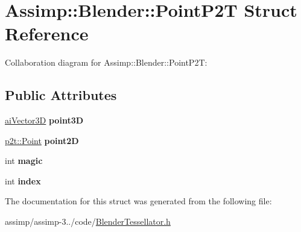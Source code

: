 \hypertarget{struct_assimp_1_1_blender_1_1_point_p2_t}{\section{Assimp\+:\+:Blender\+:\+:Point\+P2\+T Struct Reference}
\label{struct_assimp_1_1_blender_1_1_point_p2_t}
}


Collaboration diagram for Assimp\+:\+:Blender\+:\+:Point\+P2\+T\+:
\subsection*{Public Attributes}
\begin{DoxyCompactItemize}
\item 
\hypertarget{struct_assimp_1_1_blender_1_1_point_p2_t_a496ec2ad1a72b8cbeb76b5b60286ebbc}{\hyperlink{structai_vector3_d}{ai\+Vector3\+D} {\bfseries point3\+D}}\label{struct_assimp_1_1_blender_1_1_point_p2_t_a496ec2ad1a72b8cbeb76b5b60286ebbc}

\item 
\hypertarget{struct_assimp_1_1_blender_1_1_point_p2_t_af37c9a8398a17a07121573d2ff608a0b}{\hyperlink{structp2t_1_1_point}{p2t\+::\+Point} {\bfseries point2\+D}}\label{struct_assimp_1_1_blender_1_1_point_p2_t_af37c9a8398a17a07121573d2ff608a0b}

\item 
\hypertarget{struct_assimp_1_1_blender_1_1_point_p2_t_a93b81306d9ed6ab60c98f889dfb6648a}{int {\bfseries magic}}\label{struct_assimp_1_1_blender_1_1_point_p2_t_a93b81306d9ed6ab60c98f889dfb6648a}

\item 
\hypertarget{struct_assimp_1_1_blender_1_1_point_p2_t_a2f798810533e378959c3cc266d947749}{int {\bfseries index}}\label{struct_assimp_1_1_blender_1_1_point_p2_t_a2f798810533e378959c3cc266d947749}

\end{DoxyCompactItemize}


The documentation for this struct was generated from the following file\+:\begin{DoxyCompactItemize}
\item 
assimp/assimp-\/3../code/\hyperlink{_blender_tessellator_8h}{Blender\+Tessellator.\+h}\end{DoxyCompactItemize}
